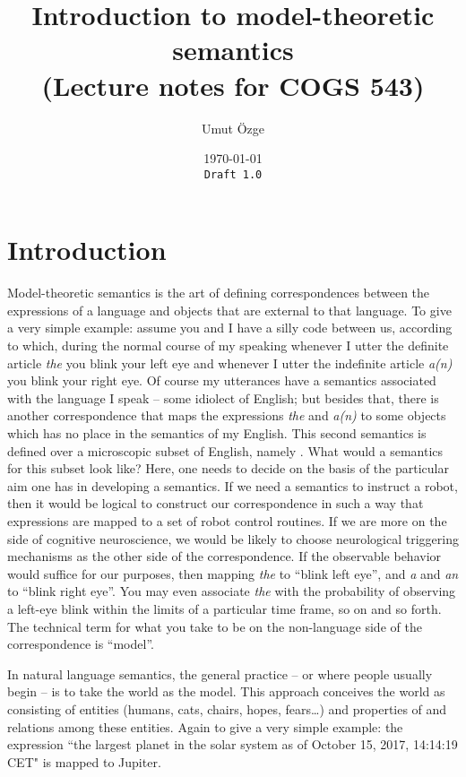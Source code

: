 \documentclass[11pt,a4paper]{article}
\title{Introduction to model-theoretic semantics\\ \small (Lecture notes for COGS 543)}
\author{Umut \"Ozge}
\date{\today\\ \texttt{Draft 1.0}}
\begin{document}
\maketitle

\section{Introduction}

Model-theoretic semantics is the art of defining correspondences between the expressions of a language and objects that are external to that language. To give a very simple example: assume you and I have a silly code between us, according to which, during the normal course of my speaking whenever I utter the definite article \emph{the} you blink your left eye and whenever I utter the indefinite article \emph{a(n)} you blink your right eye. Of course my utterances have a semantics associated with the language I speak -- some idiolect of English; but besides that, there is another correspondence that maps the expressions \emph{the} and \emph{a(n)} to some objects which has no place in the semantics of my English. This second semantics is defined over a microscopic subset of English, namely . What would a semantics for this subset look like? Here, one needs to decide on the basis of the particular aim one has in developing a semantics. If we need a semantics to instruct a robot, then it would be logical to construct our correspondence in such a way that expressions are mapped to a set of robot control routines. If we are more on the side of cognitive neuroscience, we would be likely to choose neurological triggering mechanisms as the other side of the correspondence. If the observable behavior would suffice for our purposes, then mapping \emph{the} to ``blink left eye'', and \emph{a} and \emph{an} to ``blink right eye''. You may even associate \emph{the} with the probability of observing a left-eye blink within the limits of a particular time frame, so on and so forth. The technical term for what you take to be on the non-language side of the correspondence is ``model''.

In natural language semantics, the general practice -- or where people usually begin -- is to take the world as the model. This approach conceives the world as consisting of entities (humans, cats, chairs, hopes, fears\ldots) and properties of and relations among these entities. Again to give a very simple example: the expression ``the largest planet in the solar system as of October 15, 2017, 14:14:19 CET" is mapped to Jupiter. 
\end{document}
